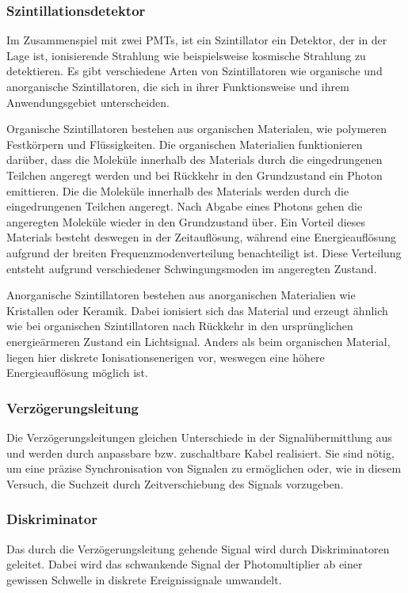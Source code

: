 \subsubsection*{Szintillationsdetektor}
Im Zusammenspiel mit zwei PMTs, ist ein Szintillator ein Detektor, der in der Lage ist, 
ionisierende Strahlung wie beispielsweise kosmische Strahlung zu detektieren. 
Es gibt verschiedene Arten von Szintillatoren wie organische und anorganische Szintillatoren,
die sich in ihrer Funktionsweise und ihrem Anwendungsgebiet unterscheiden.

Organische Szintillatoren bestehen aus organischen Materialen,
wie polymeren Festkörpern und Flüssigkeiten.
Die organischen Materialien funktionieren darüber, 
dass die Moleküle innerhalb des Materials durch die eingedrungenen Teilchen angeregt werden 
und bei Rückkehr in den Grundzustand ein Photon emittieren.
Die die Moleküle innerhalb des Materials werden durch die eingedrungenen Teilchen angeregt. 
Nach Abgabe eines Photons gehen die angeregten Moleküle wieder in den Grundzustand über.
Ein Vorteil dieses Materials besteht deswegen in der Zeitauflösung, 
während eine Energieauflösung aufgrund der breiten Frequenzmodenverteilung benachteiligt ist.
Diese Verteilung entsteht aufgrund verschiedener Schwingungsmoden im angeregten Zustand.

Anorganische Szintillatoren bestehen aus anorganischen Materialien wie Kristallen oder Keramik. 
Dabei ionisiert sich das Material und erzeugt ähnlich wie bei organischen Szintillatoren 
nach Rückkehr in den ursprünglichen energieärmeren Zustand ein Lichtsignal.
Anders als beim organischen Material, liegen hier diskrete Ionisationsenerigen vor,
weswegen eine höhere Energieauflösung möglich ist.

\subsubsection*{Verzögerungsleitung}
Die Verzögerungsleitungen gleichen Unterschiede in der Signalübermittlung aus
und werden durch anpassbare bzw. zuschaltbare Kabel realisiert.
Sie sind nötig, um eine präzise Synchronisation von Signalen zu ermöglichen
oder, wie in diesem Versuch, die Suchzeit durch Zeitverschiebung des Signals vorzugeben.

\subsubsection*{Diskriminator}
Das durch die Verzögerungsleitung gehende Signal wird durch Diskriminatoren geleitet.
Dabei wird das schwankende Signal der Photomultiplier ab einer gewissen Schwelle in diskrete
Ereignissignale umwandelt.

